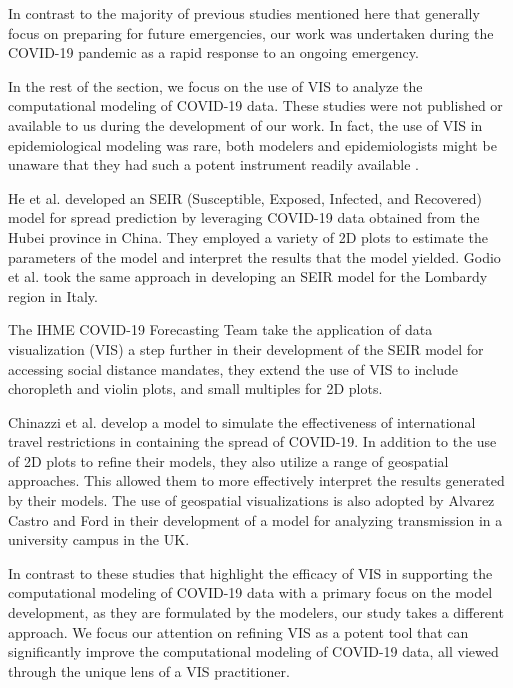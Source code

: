 In contrast to the majority of previous studies mentioned here that generally focus on preparing for future emergencies, our work was undertaken during the COVID-19 pandemic as a rapid response to an ongoing emergency.


In the rest of the section, we focus on the use of \ac{VIS} to analyze the computational modeling of COVID-19 data. These studies were not published or available to us during the development of our work. In fact, the use of VIS in epidemiological modeling was rare, both modelers and epidemiologists might be unaware that they had such a potent instrument readily available \cite{chen2022RAMPVIS}.

He et al. \cite{he2020SEIR} developed an SEIR (Susceptible, Exposed, Infected, and Recovered) model for spread prediction by leveraging COVID-19 data obtained from the Hubei province in China. They employed a variety of 2D plots to estimate the parameters of the model and interpret the results that the model yielded. Godio et al. \cite{godio2020SEIR} took the same approach in developing an SEIR model for the Lombardy region in Italy.

The IHME COVID-19 Forecasting Team \cite{ihmecovid-19forecastingteam2021Modeling} take the application of data visualization (VIS) a step further in their development of the SEIR model for accessing social distance mandates, they extend the use of \ac{VIS} to include choropleth and violin plots, and small multiples for 2D plots.

Chinazzi et al. \cite{chinazzi2020Effect} develop a model to simulate the effectiveness of international travel restrictions in containing the spread of COVID-19. In addition to the use of 2D plots to refine their models, they also utilize a range of geospatial approaches. This allowed them to more effectively interpret the results generated by their models. The use of geospatial visualizations is also adopted by Alvarez Castro and Ford \cite{alvarezcastro20213D} in their development of a model for analyzing transmission in a university campus in the UK.

In contrast to these studies that highlight the efficacy of \ac{VIS} in supporting the computational modeling of COVID-19 data with a primary focus on the model development, as they are formulated by the modelers, our study takes a different approach. We focus our attention on refining \ac{VIS} as a potent tool that can significantly improve the computational modeling of COVID-19 data, all viewed through the unique lens of a \ac{VIS} practitioner.
